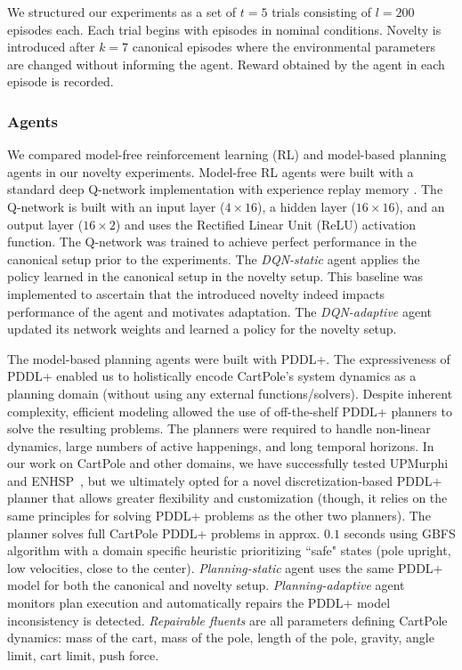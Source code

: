 \documentclass[letterpaper]{article} %
\begin{document}
We structured our experiments as a set of $t=5$ trials consisting of $l=200$ episodes each. Each trial begins with episodes in nominal conditions. Novelty is introduced after $k=7$ canonical episodes where the environmental parameters are changed without informing the agent. Reward obtained by the agent in each episode is recorded.

\subsubsection{Agents}
We compared model-free reinforcement learning (RL) and model-based planning agents in our novelty experiments. Model-free RL agents were built with a standard deep Q-network implementation with experience replay memory \cite{mnih2013playing}. The Q-network is built with an input layer ($4 \times 16$), a hidden layer ($16 \times 16$), and an output layer ($16 \times 2$) and uses the Rectified Linear Unit (ReLU) activation function. The Q-network was trained to achieve perfect performance in the canonical setup prior to the experiments. The \emph{DQN-static} agent applies the policy learned in the canonical setup in the novelty setup. This baseline was implemented to ascertain that the introduced novelty indeed impacts performance of the agent and motivates adaptation. The \emph{DQN-adaptive} agent updated its network weights and learned a policy for the novelty setup.

The model-based planning agents were built with PDDL+. The expressiveness of PDDL+ enabled us to holistically encode CartPole's system dynamics as a planning domain (without using any external functions/solvers). Despite inherent complexity, efficient modeling allowed the use of off-the-shelf PDDL+ planners to solve the resulting problems. The planners were required to handle non-linear dynamics, large numbers of active happenings, and long temporal horizons. In our work on CartPole and other domains, we have successfully tested UPMurphi~\cite{della2009upmurphi} and ENHSP~\cite{scala2016interval}, but we ultimately opted for a novel discretization-based PDDL+ planner that allows greater flexibility and customization (though, it relies on the same principles for solving PDDL+ problems as the other two planners). The planner solves full CartPole PDDL+ problems in approx. $0.1$ seconds using GBFS algorithm with a domain specific heuristic prioritizing ``safe" states (pole upright, low velocities, close to the center). \emph{Planning-static} agent uses the same PDDL+ model for both the canonical and novelty setup. \emph{Planning-adaptive} agent monitors plan execution and automatically repairs the PDDL+ model inconsistency is detected. \emph{Repairable fluents} are all parameters defining CartPole dynamics: mass of the cart, mass of the pole, length of the pole, gravity, angle limit, cart limit, push force.
\end{document}
